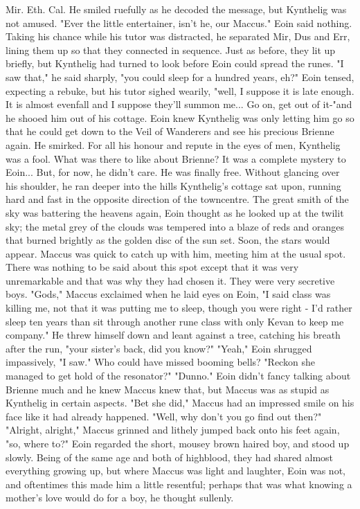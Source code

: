 \documentclass[twoside]{article}
\begin{document}
Mir. Eth. Cal.
He smiled ruefully as he decoded the message, but Kynthelig was not amused. "Ever the little entertainer, isn't he, our Maccus."
Eoin said nothing. Taking his chance while his tutor was distracted, he separated Mir, Dus and Err, lining them up so that they connected in sequence. Just as before, they lit up briefly, but Kynthelig had turned to look before Eoin could spread the runes.
"I saw that," he said sharply, "you could sleep for a hundred years, eh?" Eoin tensed, expecting a rebuke, but his tutor sighed wearily, "well, I suppose it is late enough. It is almost evenfall and I suppose they'll summon me... Go on, get out of it-"and he shooed him out of his cottage.
Eoin knew Kynthelig was only letting him go so that he could get down to the Veil of Wanderers and see his precious Brienne again. He smirked. For all his honour and repute in the eyes of men, Kynthelig was a fool. What was there to like about Brienne? It was a complete mystery to Eoin... But, for now, he didn't care. He was finally free. Without glancing over his shoulder, he ran deeper into the hills Kynthelig's cottage sat upon, running hard and fast in the opposite direction of the towncentre. The great smith of the sky was battering the heavens again, Eoin thought as he looked up at the twilit sky; the metal grey of the clouds was tempered into a blaze of reds and oranges that burned brightly as the golden disc of the sun set. Soon, the stars would appear.
Maccus was quick to catch up with him, meeting him at the usual spot. There was nothing to be said about this spot except that it was very unremarkable and that was why they had chosen it. They were very secretive boys.
"Gods," Maccus exclaimed when he laid eyes on Eoin, "I said class was killing me, not that it was putting me to sleep, though you were right - I'd rather sleep ten years than sit through another rune class with only Kevan to keep me company." He threw himself down and leant against a tree, catching his breath after the run, "your sister's back, did you know?"
"Yeah," Eoin shrugged impassively, "I saw." Who could have missed booming bells?
"Reckon she managed to get hold of the resonator?"
"Dunno." Eoin didn't fancy talking about Brienne much and he knew Maccus knew that, but Maccus was as stupid as Kynthelig in certain aspects.
"Bet she did," Maccus had an impressed smile on his face like it had already happened.
"Well, why don't you go find out then?"
"Alright, alright," Maccus grinned and lithely jumped back onto his feet again, "so, where to?"
Eoin regarded the short, mousey brown haired boy, and stood up slowly. Being of the same age and both of highblood, they had shared almost everything growing up, but where Maccus was light and laughter, Eoin was not, and oftentimes this made him a little resentful; perhaps that was what knowing a mother's love would do for a boy, he thought sullenly.
\end{document}
